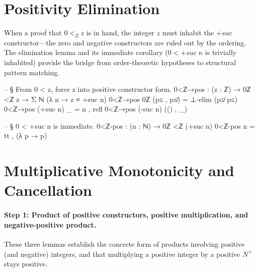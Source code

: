 \documentclass[11pt,a4paper]{book}
\def\mathrm#1{#1}%
\def\mathbb#1{#1}%
\begin{document}
\section{Positivity Elimination}

When a proof that $0 <_{\mathbb{Z}} z$ is in hand, the integer $z$ must inhabit the $+\!\mathrm{suc}$ constructor---the zero and negative constructors are ruled out by the ordering.
The elimination lemma and its immediate corollary ($0 < +\!\mathrm{suc}\;n$ is trivially inhabited) provide the bridge from order-theoretic hypotheses to structural pattern matching.

\begin{code}
-- § From 0 < z, force z into positive constructor form.
0<ℤ→pos : (z : ℤ) → 0ℤ <ℤ z → Σ ℕ (λ n → z ≡ +suc n)
0<ℤ→pos 0ℤ (p≤ , p≰) = ⊥-elim (p≰ p≤)
0<ℤ→pos (+suc n) _ = n , refl
0<ℤ→pos (-suc n) (() , _)

-- § 0 < +suc n is immediate.
0<ℤ-pos : (n : ℕ) → 0ℤ <ℤ (+suc n)
0<ℤ-pos n = tt , (λ p → p)
\end{code}

\section{Multiplicative Monotonicity and Cancellation}

\paragraph{Step 1: Product of positive constructors, positive multiplication, and negative-positive product.}
These three lemmas establish the concrete form of products involving positive (and negative) integers, and that multiplying a positive integer by a positive $\mathbb{N}^+$ stays positive.
\end{document}
